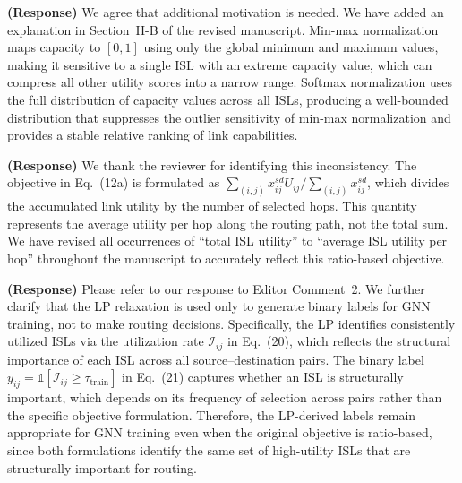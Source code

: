 \documentclass[letter]{article}
\begin{document}
\vspace{10mm}
\noindent {}

\vspace{5mm}
{\bf (Response)}
We agree that additional motivation is needed. We have added an explanation in Section~II-B of the revised manuscript. Min-max normalization maps capacity to $[0,1]$ using only the global minimum and maximum values, making it sensitive to a single ISL with an extreme capacity value, which can compress all other utility scores into a narrow range. Softmax normalization uses the full distribution of capacity values across all ISLs, producing a well-bounded distribution that suppresses the outlier sensitivity of min-max normalization and provides a stable relative ranking of link capabilities.

\vspace{10mm}
\noindent {}

\vspace{5mm}
{\bf (Response)}
We thank the reviewer for identifying this inconsistency. The objective in Eq.~(12a) is formulated as $\sum_{(i,j)} x_{ij}^{sd} U_{ij} / \sum_{(i,j)} x_{ij}^{sd}$, which divides the accumulated link utility by the number of selected hops. This quantity represents the average utility per hop along the routing path, not the total sum. We have revised all occurrences of ``total ISL utility'' to ``average ISL utility per hop'' throughout the manuscript to accurately reflect this ratio-based objective.

\vspace{10mm}
\noindent {}

\vspace{5mm}
{\bf (Response)}
Please refer to our response to Editor Comment~2. We further clarify that the LP relaxation is used only to generate binary labels for GNN training, not to make routing decisions. Specifically, the LP identifies consistently utilized ISLs via the utilization rate $\mathcal{I}_{ij}$ in Eq.~(20), which reflects the structural importance of each ISL across all source--destination pairs. The binary label $y_{ij} = \mathbb{1}[\mathcal{I}_{ij} \geq \tau_{\text{train}}]$ in Eq.~(21) captures whether an ISL is structurally important, which depends on its frequency of selection across pairs rather than the specific objective formulation. Therefore, the LP-derived labels remain appropriate for GNN training even when the original objective is ratio-based, since both formulations identify the same set of high-utility ISLs that are structurally important for routing.
\end{document}
